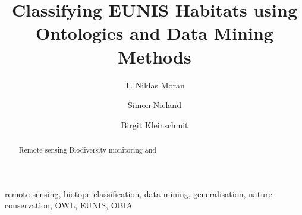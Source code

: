 \documentclass[authoryear, review,12pt,number]{elsarticle}
\begin{document}



\begin{frontmatter}
\linenumbers
\title{Classifying EUNIS Habitats using Ontologies and Data Mining Methods}


\author[TUB]{T. Niklas Moran}

\author[TUB]{Simon Nieland}
\author[TUB]{Birgit Kleinschmit}


\address[TUB]{Geoinformation in Environmental Planning Lab, Technische
Universit\"at Berlin, Stra\ss e des 17. Juni 145, 10623 Berlin, Germany}


\begin{abstract}
Remote sensing Biodiversity monitoring and 
\end{abstract}

\begin{keyword}
remote sensing, biotope classification, data mining,
generalisation, nature conservation, OWL, EUNIS, OBIA
\end{keyword}

\end{frontmatter}

\linenumbers
\end{document}
